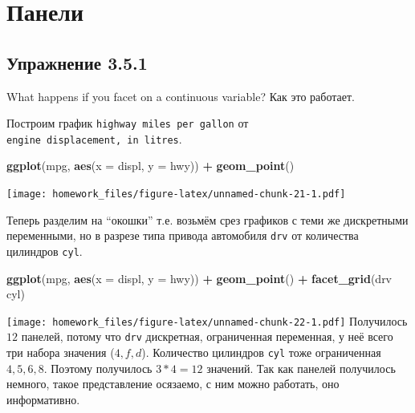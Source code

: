 \documentclass[]{book}
\newenvironment{Shaded}{\begin{snugshade}}{\end{snugshade}}
\newcommand{\KeywordTok}[1]{\textcolor[rgb]{0.13,0.29,0.53}{\textbf{#1}}}
\newcommand{\DataTypeTok}[1]{\textcolor[rgb]{0.13,0.29,0.53}{#1}}
\newcommand{\StringTok}[1]{\textcolor[rgb]{0.31,0.60,0.02}{#1}}
\newcommand{\OperatorTok}[1]{\textcolor[rgb]{0.81,0.36,0.00}{\textbf{#1}}}
\newcommand{\NormalTok}[1]{#1}
\begin{document}
\section{Панели}

\subsection*{Упражнение 3.5.1}\label{-3.5.1}

What happens if you facet on a continuous variable? Как это работает.

Построим график \texttt{highway\ miles\ per\ gallon} от
\texttt{engine\ displacement,\ in\ litres}.

\begin{Shaded}
\begin{Highlighting}[]
\KeywordTok{ggplot}\NormalTok{(mpg, }\KeywordTok{aes}\NormalTok{(}\DataTypeTok{x =}\NormalTok{ displ, }\DataTypeTok{y =}\NormalTok{ hwy)) }\OperatorTok{+}
\StringTok{   }\KeywordTok{geom_point}\NormalTok{()}
\end{Highlighting}
\end{Shaded}

\texttt{[image: homework\_files/figure-latex/unnamed-chunk-21-1.pdf]}

Теперь разделим на ``окошки'' т.е. возьмём срез графиков с теми же
дискретными переменными, но в разрезе типа привода автомобиля
\texttt{drv} от количества цилиндров \texttt{cyl}.

\begin{Shaded}
\begin{Highlighting}[]
\KeywordTok{ggplot}\NormalTok{(mpg, }\KeywordTok{aes}\NormalTok{(}\DataTypeTok{x =}\NormalTok{ displ, }\DataTypeTok{y =}\NormalTok{ hwy)) }\OperatorTok{+}
\StringTok{  }\KeywordTok{geom_point}\NormalTok{() }\OperatorTok{+}
\StringTok{  }\KeywordTok{facet_grid}\NormalTok{(drv}\OperatorTok{~}\StringTok{ }\NormalTok{cyl)}
\end{Highlighting}
\end{Shaded}

\texttt{[image: homework\_files/figure-latex/unnamed-chunk-22-1.pdf]}
Получилось \(12\) панелей, потому что \texttt{drv} дискретная,
ограниченная переменная, у неё всего три набора значения (\(4, f, d\)).
Количество цилиндров \texttt{cyl} тоже ограниченная \(4,5,6,8\). Поэтому
получилось \(3*4=12\) значений. Так как панелей получилось немного,
такое представление осязаемо, с ним можно работать, оно информативно.
\end{document}
